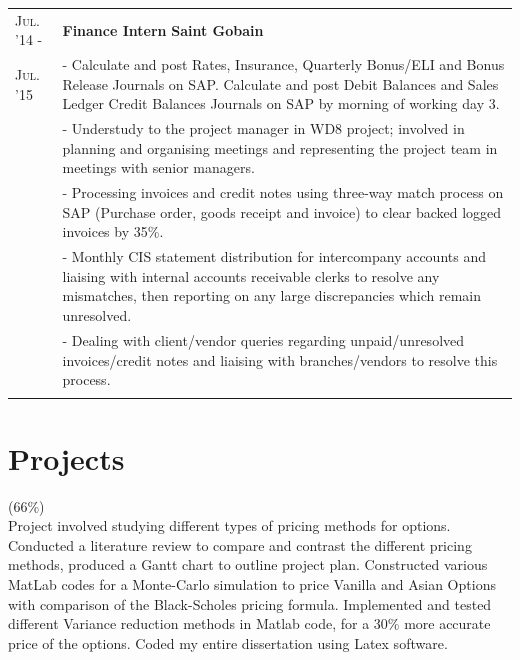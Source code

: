 \documentclass[a4paper,10pt]{extarticle} %
\begin{document}
{\begin{tabularx}{\linewidth}{ l | X }
\textsc{Jul. '14 -} & \textbf{Finance Intern} \hfill\textbf{Saint Gobain}\\
\textsc{Jul. '15}
& {- Calculate and post Rates, Insurance, Quarterly Bonus/ELI and Bonus Release Journals on SAP. Calculate and post Debit Balances and Sales Ledger Credit Balances Journals on SAP by morning of working day 3.}\\
& {- Understudy to the project manager in WD8 project; involved in planning and organising meetings and representing the project team in meetings with senior managers. }\\
& {- Processing invoices and credit notes using three-way match process on SAP (Purchase order, goods receipt and invoice) to clear backed logged invoices by 35\%. }\\
& {- Monthly CIS statement distribution for intercompany accounts and liaising with internal accounts receivable clerks to resolve any mismatches, then reporting on any large discrepancies which remain unresolved. }\\
& {- Dealing with client/vendor queries regarding unpaid/unresolved invoices/credit notes and liaising with branches/vendors to resolve this process. }\\
\multicolumn{1}{c}{} \\

\end{tabularx}




\section{\textcolor{primary}{Projects}}
\vspace{0.1cm}
\begin{description}
\sloppy
\item[Pricing Asian Options ] (66\%) \hfill \\
Project involved studying different types of pricing methods for options. Conducted a literature review to compare and contrast the different pricing methods, produced a Gantt chart to outline project plan. Constructed various MatLab codes for a Monte-Carlo simulation to price Vanilla and Asian Options with comparison of the Black-Scholes pricing formula. Implemented and tested different Variance reduction methods in Matlab code, for a 30\% more accurate price of the options. Coded my entire dissertation using Latex software.


\end{description}}
\end{document}
